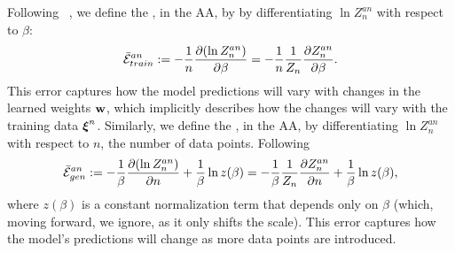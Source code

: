 {Following ~\cite{LTS90, Solla2023},
we define the \emph{\AverageTrainingError}, in the AA,
by by differentiating $\ln Z^{an}_{n}$ with respect to $\beta$:
\begin{align}
  \label{eqn:avgte_def}
  \bar{\mathcal{E}}_{train}^{an}
  := -\frac{1}{n}\dfrac{\partial (\ln Z^{an}_{n})}{\partial \beta} 
  = -\frac{1}{n}\frac{1}{Z_{n}}\dfrac{\partial Z^{an}_{n}}{\partial \beta} .
\end{align}
This error captures how the model predictions will vary with changes in the learned
weights ${\mathbf{w}}$, which implicitly describes how the changes will vary with the
training data $\boldsymbol{\xi}^{n}$.
%
Similarly, 
we define the \emph{\AverageGeneralizationError}, in the AA,
by differentiating $\ln Z^{an}_{n}$ with respect to $n$, the number of data points.
Following 
\begin{align}
  \label{eqn:avgge_def}
  \bar{\mathcal{E}}_{gen}^{an}
  := -\frac{1}{\beta}\dfrac{\partial (\ln Z^{an}_{n})}{\partial n}    +\frac{1}{\beta}\ln z(\beta)  
  =  -\frac{1}{\beta}\frac{1}{Z_{n}}\dfrac{\partial Z^{an}_{n}}{\partial n}
  +\frac{1}{\beta}\ln z(\beta) ,
\end{align}
where $z(\beta)$ is a constant normalization term that depends only on $\beta$ (which, moving forward, we ignore, as it only shifts the scale).
This error captures how the model’s predictions will change as more data points are introduced.

}
